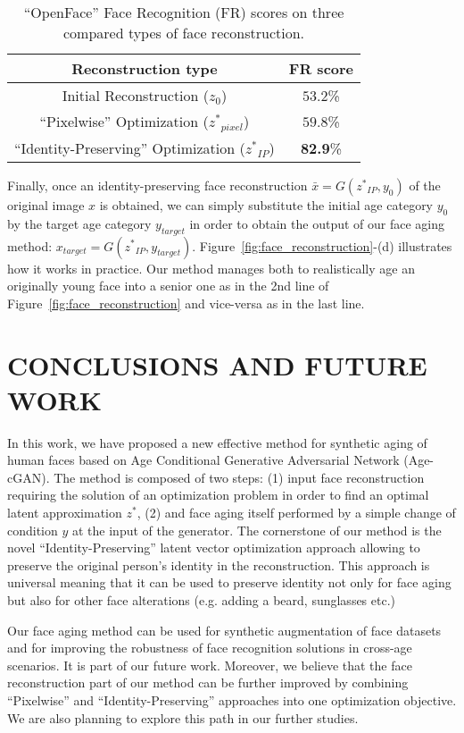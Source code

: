\documentclass{article}
\begin{document}
\begin{table}
	\centering
	\small
		\begin{tabular}{|c|c|}
		\hline
		Reconstruction type & FR score\\
		\hline
		\hline
		Initial Reconstruction (${z_{0}}$) & $53.2$\% \\
		\hline
		\hline
		``Pixelwise'' Optimization (${z^{*}}_{pixel}$) & $59.8$\% \\
		\hline
		``Identity-Preserving'' Optimization (${z^{*}}_{IP}$) & \textbf{82.9}\% \\
		\hline
		\end{tabular}
	\caption{``OpenFace'' Face Recognition (FR) scores on three compared types of face reconstruction.}
	\label{tab:face_reconstruction_scores}
\end{table}

Finally, once an identity-preserving face reconstruction $\bar{x}=G({z^{*}}_{IP},y_{0})$ of the original image $x$ is obtained, we can simply substitute the initial age category $y_{0}$ by the target age category $y_{target}$ in order to obtain the output of our face aging method: $x_{target}=G({z^{*}}_{IP},y_{target})$.
Figure~\ref{fig:face_reconstruction}-(d) illustrates how it works in practice.
Our method manages both to realistically age an originally young face into a senior one as in the 2nd line of Figure~\ref{fig:face_reconstruction} and vice-versa as in the last line.

\section{CONCLUSIONS AND FUTURE WORK}
\label{sec:conclusions_future_works}

In this work, we have proposed a new effective method for synthetic aging of human faces based on Age Conditional Generative Adversarial Network (Age-cGAN).
The method is composed of two steps: (1) input face reconstruction requiring the solution of an optimization problem in order to find an optimal latent approximation $z^{*}$, (2) and face aging itself performed by a simple change of condition $y$ at the input of the generator.
The cornerstone of our method is the novel ``Identity-Preserving'' latent vector optimization approach allowing to preserve the original person's identity in the reconstruction.
This approach is universal meaning that it can be used to preserve identity not only for face aging but also for other face alterations (e.g. adding a beard, sunglasses etc.)

Our face aging method can be used for synthetic augmentation of face datasets and for improving the robustness of face recognition solutions in cross-age scenarios.
It is part of our future work.
Moreover, we believe that the face reconstruction part of our method can be further improved by combining ``Pixelwise'' and ``Identity-Preserving'' approaches into one optimization objective.
We are also planning to explore this path in our further studies.



\end{document}
